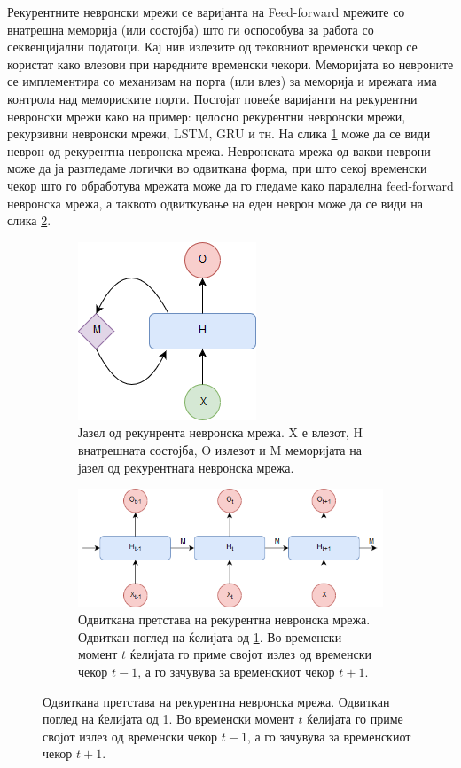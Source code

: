 Рекурентните невронски мрежи се варијанта на Feed-forward мрежите со внатрешна меморија (или состојба) што ги оспособува за работа со секвенцијални податоци. Кај нив излезите од тековниот временски чекор се користат како влезови при наредните временски чекори. Меморијата во невроните се имплементира со механизам на порта (или влез) за меморија и мрежата има контрола над мемориските порти. Постојат повеќе варијанти на рекурентни невронски мрежи како на пример: целосно рекурентни невронски мрежи, рекурзивни невронски мрежи, LSTM, GRU и тн. На слика \ref{fig:rnn_folded} може да се види неврон од рекурентна невронска мрежа. Невронската мрежа од вакви неврони може да ја разгледаме логички во одвиткана форма, при што секој временски чекор што го обработува мрежата може да го гледаме како паралелна feed-forward невронска мрежа, а таквото одвиткување на еден неврон може да се види на слика \ref{fig:rnn_unfolded}.

\begin{figure}[H]
	\centering
	\caption{Рекурентна невронска мрежа.}
    \begin{subfigure}[t]{1\linewidth} 
        \centering\includegraphics[width=.3\linewidth]{images/rnn_folded.png}
        \caption{Јазел од рекунрента невронска мрежа. X е влезот, H внатрешната состојба, O излезот и M меморијата на јазел од рекурентната невронска мрежа.}	
        \label{fig:rnn_folded}
    \end{subfigure}
    \begin{subfigure}[t]{1\linewidth}       
        \centering\includegraphics[width=.7\linewidth]{images/rnn_unfolded.png}
        \caption{Одвиткана претстава на рекурентна невронска мрежа. Одвиткан поглед на ќелијата од \ref{fig:rnn_folded}. Во временски момент $t$ ќелијата го приме својот излез од временски чекор $t-1$, а го зачувува за временскиот чекор $t+1$.}
        \label{fig:rnn_unfolded}
    \end{subfigure}
	\label{fig:rnn}
\end{figure}

